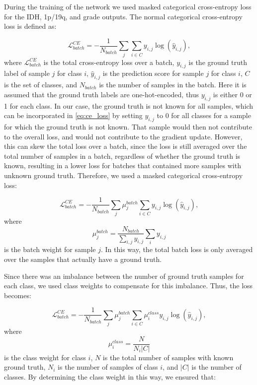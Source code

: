 \begin{subappendices}
During the training of the network we used masked categorical cross-entropy loss for the IDH, 1p/19q, and grade outputs.
The normal categorical cross-entropy loss is defined as:

\begin{equation}
    \mathcal{L}^{CE}_{batch} = -\frac{1}{N_{batch}} \sum_{j} \sum_{i \in C} y_{i, j} \log \left(\hat{y}_{i, j} \right),
\label{eq:ce_loss}
\end{equation}
where $\mathcal{L}^{CE}_{batch}$ is the total cross-entropy loss over a batch, $y_{i,j}$ is the ground truth label of sample $j$ for class $i$, $\hat{y}_{i,j}$ is the prediction score for sample $j$ for class $i$, $C$ is the set of classes, and $N_{batch}$ is the number of samples in the batch.
Here it is assumed that the ground truth labels are one-hot-encoded, thus $y_{i,j}$ is either 0 or 1 for each class.
In our case, the ground truth is not known for all samples, which can be incorporated in  \cref{eq:ce_loss} by setting $y_{i,j}$ to 0 for all classes for a sample for which the ground truth is not known.
That sample would then not contribute to the overall loss, and would not contribute to the gradient update.
However, this can skew the total loss over a batch, since the loss is still averaged over the total number of samples in a batch, regardless of whether the ground truth is known, resulting in a lower loss for batches that contained more samples with unknown ground truth.
Therefore, we used a masked categorical cross-entropy loss:

\begin{equation}
    \mathcal{L}^{CE}_{batch} = -\frac{1}{N_{batch}} \sum_{j} \mu_j^{batch} \sum_{i \in C} y_{i, j} \log \left(\hat{y}_{i, j} \right),
\end{equation}
where
\begin{equation}
\mu_j^{batch} = \frac{N_{batch}}{\sum_{i,j} y_{i,j}} \sum_i y_{i,j}
\end{equation}
is the batch weight for sample $j$.
In this way, the total batch loss is only averaged over the samples that actually have a ground truth.

Since there was an imbalance between the number of ground truth samples for each class, we used class weights to compensate for this imbalance.
Thus, the loss becomes:

\begin{equation}
    \mathcal{L}^{CE}_{batch} = -\frac{1}{N_{batch}} \sum_{j} \mu_j^{batch} \sum_{i \in C} \mu_i^{class} y_{i, j} \log \left(\hat{y}_{i, j} \right),
\end{equation}
where
\begin{equation}
    \mu_{i}^{class} =  \frac{N}{N_{i} \left|C\right|}
\end{equation}
is the class weight for class $i$, $N$ is the total number of samples with known ground truth, $N_i$ is the number of samples of class $i$, and $\left|C\right|$ is the number of classes.
By determining the class weight in this way, we ensured that:


\end{subappendices}
